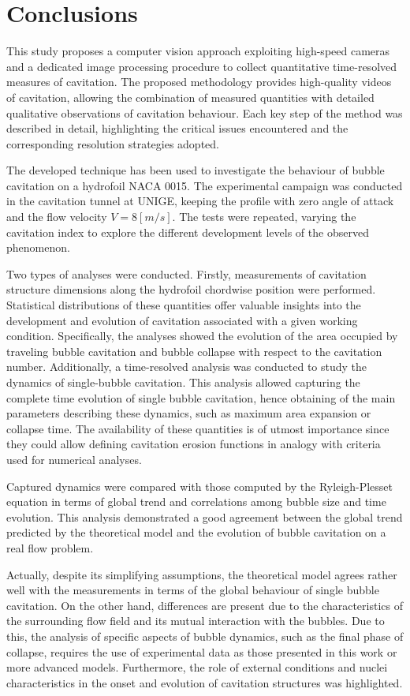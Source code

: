 \section{Conclusions}
\label{sez_conclusion}
This study proposes a computer vision approach exploiting high-speed cameras and a dedicated image processing procedure to collect quantitative time-resolved measures of cavitation. 
The proposed methodology provides high-quality videos of cavitation, allowing the combination of measured quantities with detailed qualitative observations of cavitation behaviour. Each key step of the method was described in detail, highlighting the critical issues encountered and the corresponding resolution strategies adopted.

The developed technique has been used to investigate the behaviour of bubble cavitation on a hydrofoil NACA 0015. The experimental campaign was conducted in the cavitation tunnel at UNIGE, keeping the profile with zero angle of attack and the flow velocity $V = 8 [m/s]$. The tests were repeated, varying the cavitation index to explore the different development levels of the observed phenomenon. 

Two types of analyses were conducted. Firstly, measurements of cavitation structure dimensions along the hydrofoil chordwise position were performed. Statistical distributions of these quantities offer valuable insights into the development and evolution of cavitation associated with a given working condition. Specifically, the analyses showed the evolution of the area occupied by traveling bubble cavitation and bubble collapse with respect to the cavitation number.
Additionally, a time-resolved analysis was conducted to study the dynamics of single-bubble cavitation. This analysis allowed capturing the complete time evolution of single bubble cavitation, hence obtaining of the main parameters describing these dynamics, such as maximum area expansion or collapse time. The availability of these quantities is of utmost importance since they could allow defining cavitation erosion functions in analogy with criteria used for numerical analyses.

Captured dynamics were compared with those computed by the Ryleigh-Plesset equation in terms of global trend and correlations among bubble size and time evolution. This analysis demonstrated a good agreement between the global trend predicted by the theoretical model and the evolution of bubble cavitation on a real flow problem.

Actually, despite its simplifying assumptions, the theoretical model agrees rather well with the measurements in terms of the global behaviour of single bubble cavitation. On the other hand, differences are present due to the characteristics of the surrounding flow field and its mutual interaction with the bubbles. Due to this, the analysis of specific aspects of bubble dynamics, such as the final phase of collapse, requires the use of experimental data as those presented in this work or more advanced models. Furthermore, the role of external conditions and nuclei characteristics in the onset and evolution of cavitation structures was highlighted.

